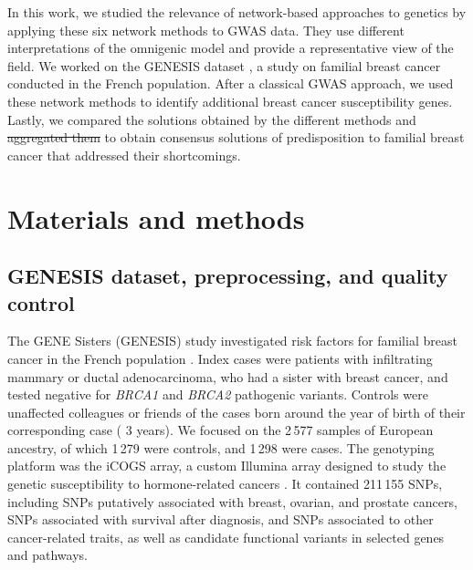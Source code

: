 \documentclass[10pt,letterpaper]{article}
\providecommand{\DIFaddtex}[1]{{\protect\color{blue}\uwave{#1}}} %
\providecommand{\DIFdeltex}[1]{{\protect\color{red}\sout{#1}}}                      %
\providecommand{\DIFaddbegin}{} %
\providecommand{\DIFaddend}{} %
\providecommand{\DIFdelbegin}{} %
\providecommand{\DIFdelend}{} %
\providecommand{\DIFadd}[1]{\texorpdfstring{\DIFaddtex{#1}}{#1}} %
\providecommand{\DIFdel}[1]{\texorpdfstring{\DIFdeltex{#1}}{}} %
\newcommand{\DIFscaledelfig}{0.5}
\newlength{\DIFdelgraphicswidth} %
\newlength{\DIFdelgraphicsheight} %
\newcommand{\DIFaddincludegraphics}[2][]{{\color{blue}\fbox{\DIFOincludegraphics[#1]{#2}}}} %
\newcommand{\DIFdelincludegraphics}[2][]{%
\sbox{\DIFdelgraphicsbox}{\DIFOincludegraphics[#1]{#2}}%
\settoboxwidth{\DIFdelgraphicswidth}{\DIFdelgraphicsbox} %
\settoboxtotalheight{\DIFdelgraphicsheight}{\DIFdelgraphicsbox} %
\scalebox{\DIFscaledelfig}{%
\parbox[b]{\DIFdelgraphicswidth}{\usebox{\DIFdelgraphicsbox}\\[-\baselineskip] \rule{\DIFdelgraphicswidth}{0em}}\llap{\resizebox{\DIFdelgraphicswidth}{\DIFdelgraphicsheight}{%
\setlength{\unitlength}{\DIFdelgraphicswidth}%
\begin{picture}(1,1)%
\thicklines\linethickness{2pt} %
{\color[rgb]{1,0,0}\put(0,0){\framebox(1,1){}}}%
{\color[rgb]{1,0,0}\put(0,0){\line( 1,1){1}}}%
{\color[rgb]{1,0,0}\put(0,1){\line(1,-1){1}}}%
\end{picture}%
}\hspace*{3pt}}} %
} %
\DeclareRobustCommand{\DIFaddbegin}{\DIFOaddbegin \let\includegraphics\DIFaddincludegraphics} %
\DeclareRobustCommand{\DIFaddend}{\DIFOaddend \let\includegraphics\DIFOincludegraphics} %
\DeclareRobustCommand{\DIFdelbegin}{\DIFOdelbegin \let\includegraphics\DIFdelincludegraphics} %
\DeclareRobustCommand{\DIFdelend}{\DIFOaddend \let\includegraphics\DIFOincludegraphics} %
\begin{document}
In this work, we studied the relevance of network-based approaches to genetics by applying these six network methods to GWAS data. They use different interpretations of the omnigenic model and provide a representative view of the field. We worked on the GENESIS dataset \cite{sinilnikova_genesis:_2016}, a study on familial breast cancer conducted in the French population. After a classical GWAS approach, we used these network methods to identify additional breast cancer susceptibility genes. Lastly, we compared the solutions obtained by the different methods and \DIFdelbegin \DIFdel{aggregated them }\DIFdelend \DIFaddbegin \DIFadd{studied their intersection }\DIFaddend to obtain consensus solutions of predisposition to familial breast cancer that addressed their shortcomings. 

\section{Materials and methods}

\subsection{GENESIS dataset, preprocessing, and quality control}
\label{methods:data}

The GENE Sisters (GENESIS) study investigated risk factors for familial breast cancer in the French population \cite{sinilnikova_genesis:_2016}. Index cases were patients with infiltrating mammary or ductal adenocarcinoma, who had a sister with breast cancer, and tested negative for \emph{BRCA1} and \emph{BRCA2} pathogenic variants. Controls were unaffected colleagues or friends of the cases born around the year of birth of their corresponding case (\textpm{} 3 years). We focused on the 2\,577 samples of European ancestry, of which 1\,279 were controls, and 1\,298 were cases. The genotyping platform was the iCOGS array, a custom Illumina array designed to study the genetic susceptibility to hormone-related cancers \cite{sakoda_turning_2013}. It contained 211\,155 SNPs, including SNPs putatively associated with breast, ovarian, and prostate cancers, SNPs associated with survival after diagnosis, and SNPs associated to other cancer-related traits, as well as candidate functional variants in selected genes and pathways.
\end{document}
